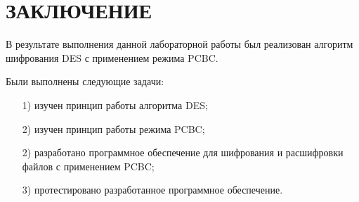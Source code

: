\documentclass{bmstu}
\begin{document}
{\centering \chapter*{ЗАКЛЮЧЕНИЕ}}

В результате выполнения данной лабораторной работы был реализован алгоритм шифрования DES с применением режима PCBC.

Были выполнены следующие задачи:
\begin{enumerate}
\item[1)] изучен принцип работы алгоритма DES;
\item[2)] изучен принцип работы режима PCBC;
\item[2)] разработано программное обеспечение для шифрования и расшифровки файлов с применением PCBC;
\item[3)] протестировано разработанное программное обеспечение.
\end{enumerate}

{\centering \printbibliography[title=СПИСОК ИСПОЛЬЗОВАННЫХ ИСТОЧНИКОВ,heading=bibintoc]}
\end{document}
